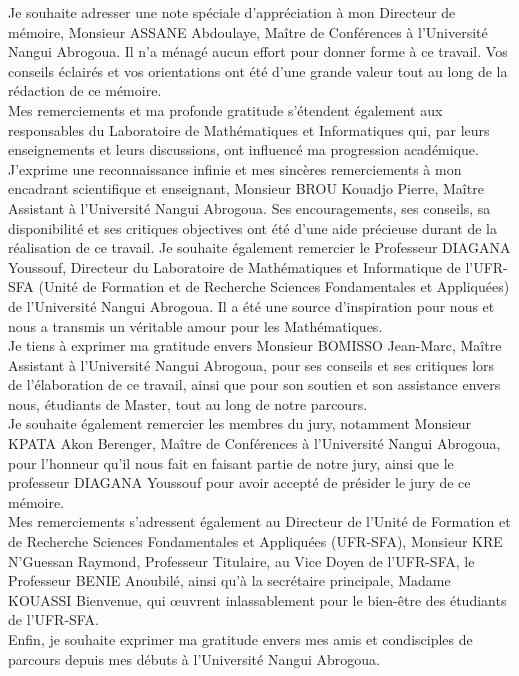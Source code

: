 Je souhaite adresser une note spéciale d'appréciation à mon Directeur de mémoire, Monsieur ASSANE Abdoulaye, Maître de Conférences à l'Université Nangui Abrogoua. Il n'a ménagé aucun effort pour donner forme à ce travail. Vos conseils éclairés et vos orientations ont été d'une grande valeur tout au long de la rédaction de ce mémoire.\\
Mes remerciements et ma profonde gratitude s'étendent également aux responsables du Laboratoire de Mathématiques et Informatiques qui, par leurs enseignements et leurs discussions, ont influencé ma progression académique.\\
J'exprime une reconnaissance infinie et mes sincères remerciements à mon encadrant scientifique et enseignant, Monsieur BROU Kouadjo Pierre, Maître Assistant à l'Université Nangui Abrogoua. Ses encouragements, ses conseils, sa disponibilité et ses critiques objectives ont été d'une aide précieuse durant de la réalisation de ce travail. Je souhaite également remercier le Professeur DIAGANA Youssouf, Directeur du Laboratoire de Mathématiques et Informatique de l'UFR-SFA (Unité de Formation et de Recherche Sciences Fondamentales et Appliquées) de l'Université Nangui Abrogoua. Il a été une source d'inspiration pour nous et nous a transmis un véritable amour pour les Mathématiques.\\
Je tiens à exprimer ma gratitude envers Monsieur BOMISSO Jean-Marc, Maître Assistant à l'Université Nangui Abrogoua, pour ses conseils et ses critiques lors de l'élaboration de ce travail, ainsi que pour son soutien et son assistance envers nous, étudiants de Master, tout au long de notre parcours.\\
Je souhaite également remercier les membres du jury, notamment Monsieur KPATA Akon Berenger, Maître de Conférences à l'Université Nangui Abrogoua, pour l'honneur qu'il nous fait en faisant partie de notre jury, ainsi que le professeur DIAGANA Youssouf pour avoir accepté de présider le jury de ce mémoire.\\
Mes remerciements s'adressent également au Directeur de l'Unité de Formation et de Recherche Sciences Fondamentales et Appliquées (UFR-SFA), Monsieur KRE N'Guessan Raymond, Professeur Titulaire, au Vice Doyen de l'UFR-SFA, le Professeur BENIE Anoubilé, ainsi qu'à la secrétaire principale, Madame KOUASSI Bienvenue, qui œuvrent inlassablement pour le bien-être des étudiants de l'UFR-SFA.\\
Enfin, je souhaite exprimer ma gratitude envers mes amis et condisciples de parcours depuis mes débuts à l'Université Nangui Abrogoua.
